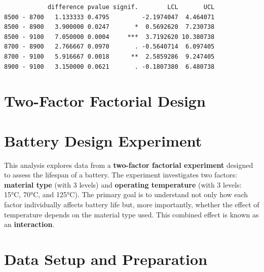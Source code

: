 \documentclass[
  letterpaper,
  DIV=11,
  numbers=noendperiod]{scrreprt}
\newenvironment{Shaded}{\begin{snugshade}}{\end{snugshade}}
\newcommand{\AttributeTok}[1]{\textcolor[rgb]{0.40,0.45,0.13}{#1}}
\newcommand{\CommentTok}[1]{\textcolor[rgb]{0.37,0.37,0.37}{#1}}
\newcommand{\ConstantTok}[1]{\textcolor[rgb]{0.56,0.35,0.01}{#1}}
\newcommand{\FunctionTok}[1]{\textcolor[rgb]{0.28,0.35,0.67}{#1}}
\newcommand{\NormalTok}[1]{\textcolor[rgb]{0.00,0.23,0.31}{#1}}
\newcommand{\OtherTok}[1]{\textcolor[rgb]{0.00,0.23,0.31}{#1}}
\newcommand{\SpecialCharTok}[1]{\textcolor[rgb]{0.37,0.37,0.37}{#1}}
\newcommand{\StringTok}[1]{\textcolor[rgb]{0.13,0.47,0.30}{#1}}
\begin{document}
\begin{Shaded}
\end{Shaded}

\begin{verbatim}
            difference pvalue signif.        LCL       UCL
8500 - 8700   1.133333 0.4795         -2.1974047  4.464071
8500 - 8900   3.900000 0.0247       *  0.5692620  7.230738
8500 - 9100   7.050000 0.0004     ***  3.7192620 10.380738
8700 - 8900   2.766667 0.0970       . -0.5640714  6.097405
8700 - 9100   5.916667 0.0018      **  2.5859286  9.247405
8900 - 9100   3.150000 0.0621       . -0.1807380  6.480738
\end{verbatim}

\section{Two-Factor Factorial Design}\label{two-factor-factorial-design}

\section{Battery Design Experiment}\label{battery-design-experiment}

This analysis explores data from a \textbf{two-factor factorial
experiment} designed to assess the lifespan of a battery. The experiment
investigates two factors: \textbf{material type} (with 3 levels) and
\textbf{operating temperature} (with 3 levels: 15°C, 70°C, and 125°C).
The primary goal is to understand not only how each factor individually
affects battery life but, more importantly, whether the effect of
temperature depends on the material type used. This combined effect is
known as an \textbf{interaction}.

\section{Data Setup and Preparation}\label{data-setup-and-preparation}
\end{document}
